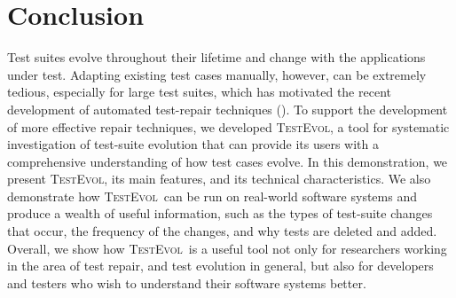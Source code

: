 \documentclass[conference]{IEEEtran}
\newcommand{\tool}{\textsc{TestEvol}\xspace}
\begin{document}
\vspace*{-8pt}
\section{Conclusion}
\label{sec:summary}

Test suites evolve throughout their lifetime and change with the
applications under test. Adapting existing test cases manually,
however, can be extremely tedious, especially for large test suites,
which has motivated the recent development of automated test-repair
techniques (\eg \cite{Daniel:2009, Daniel:2010, Mirzaaghaei:2012}).
To support the development of more effective repair techniques, we
developed \tool, a tool for systematic investigation of test-suite
evolution that can provide its users with a comprehensive
understanding of how test cases evolve. In this demonstration, we
present \tool, its main features, and its technical characteristics.
We also demonstrate how \tool\ can be run on real-world software
systems and produce a wealth of useful information, such as the types
of test-suite changes that occur, the frequency of the changes, and
why tests are deleted and added.  Overall, we show how \tool\ is a
useful tool not only for researchers working in the area of test
repair, and test evolution in general, but also for developers and
testers who wish to understand their software systems better.




{\footnotesize

}
\end{document}
